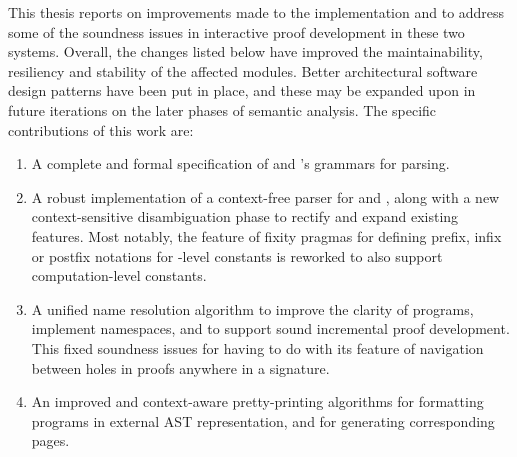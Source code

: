This thesis reports on improvements made to the implementation \Beluga and \Harpoon to address some of the soundness issues in interactive proof development in these two systems.
Overall, the changes listed below have improved the maintainability, resiliency and stability of the affected modules.
Better architectural software design patterns have been put in place, and these may be expanded upon in future iterations on the later phases of semantic analysis.
The specific contributions of this work are:
\begin{enumerate}
\item
A complete and formal specification of \Beluga and \Harpoon's grammars for parsing.
\item
A robust implementation of a context-free parser for \Beluga and \Harpoon, along with a new context-sensitive disambiguation phase to rectify and expand existing features.
Most notably, the \Beluga feature of fixity pragmas for defining prefix, infix or postfix notations for \LF-level constants is reworked to also support computation-level constants.
\item
A unified name resolution algorithm to improve the clarity of \Beluga programs, implement namespaces, and to support sound incremental proof development.
This fixed soundness issues for \Harpoon having to do with its feature of navigation between holes in proofs anywhere in a \Beluga signature.
\item
An improved and context-aware pretty-printing algorithms for formatting \Beluga programs in external \ac{AST} representation, and for generating corresponding \HTML pages.
\end{enumerate}



